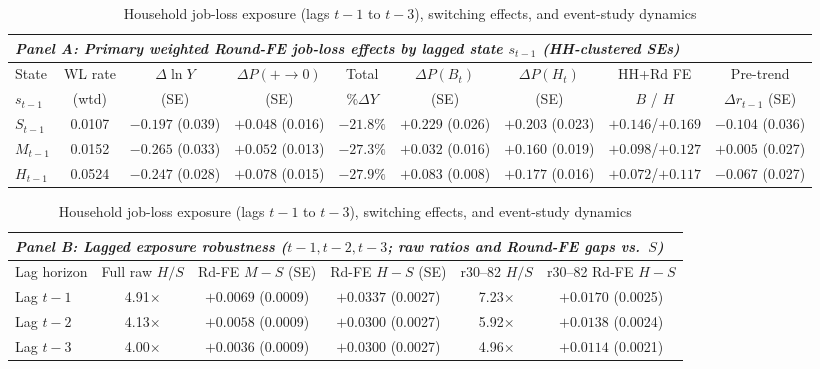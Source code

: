 \documentclass[11pt]{article}
\begin{document}
\begin{table}[tbp]
\centering
\caption{Household job-loss exposure (lags $t-1$ to $t-3$), switching effects, and event-study dynamics}
\label{tab:workloss}
\scriptsize
\setlength{\tabcolsep}{1.4pt}
\begin{tabular}{lcccccccc}
\toprule
\multicolumn{9}{l}{\textit{Panel A: Primary weighted Round-FE job-loss effects by lagged state $s_{t-1}$ (HH-clustered SEs)}} \\
\midrule
State & WL rate & $\Delta \ln Y$ & $\Delta P(+\!\to\!0)$ & Total & $\Delta P(B_t)$ & $\Delta P(H_t)$ & HH+Rd FE & Pre-trend \\
$s_{t-1}$ & (wtd) & (SE) & (SE) & $\% \Delta Y$ & (SE) & (SE) & $B$ / $H$ & $\Delta r_{t-1}$ (SE) \\
\midrule
$S_{t-1}$ & 0.0107 & $-0.197$ (0.039) & $+0.048$ (0.016) & $-21.8\%$ & $+0.229$ (0.026) & $+0.203$ (0.023) & $+0.146$/$+0.169$ & $-0.104$ (0.036) \\
$M_{t-1}$ & 0.0152 & $-0.265$ (0.033) & $+0.052$ (0.013) & $-27.3\%$ & $+0.032$ (0.016) & $+0.160$ (0.019) & $+0.098$/$+0.127$ & $+0.005$ (0.027) \\
$H_{t-1}$ & 0.0524 & $-0.247$ (0.028) & $+0.078$ (0.015) & $-27.9\%$ & $+0.083$ (0.008) & $+0.177$ (0.016) & $+0.072$/$+0.117$ & $-0.067$ (0.027) \\
\bottomrule
\end{tabular}

\medskip
\begin{tabular}{lccccc}
\toprule
\multicolumn{6}{l}{\textit{Panel B: Lagged exposure robustness ($t-1, t-2, t-3$; raw ratios and Round-FE gaps vs.\ $S$)}} \\
\midrule
Lag horizon & Full raw $H/S$ & Rd-FE $M-S$ (SE) & Rd-FE $H-S$ (SE) & r30--82 $H/S$ & r30--82 Rd-FE $H-S$ \\
\midrule
Lag $t-1$ & 4.91$\times$ & $+0.0069$ (0.0009) & $+0.0337$ (0.0027) & 7.23$\times$ & $+0.0170$ (0.0025) \\
Lag $t-2$ & 4.13$\times$ & $+0.0058$ (0.0009) & $+0.0300$ (0.0027) & 5.92$\times$ & $+0.0138$ (0.0024) \\
Lag $t-3$ & 4.00$\times$ & $+0.0036$ (0.0009) & $+0.0300$ (0.0027) & 4.96$\times$ & $+0.0114$ (0.0021) \\
\bottomrule
\end{tabular}


\end{table}
\end{document}
